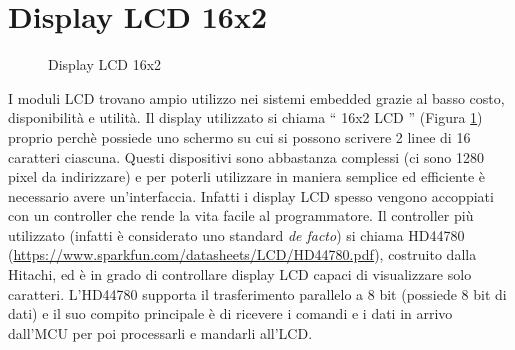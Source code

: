 \documentclass[12pt]{report}
\begin{document}
%
\section{Display LCD 16x2}
%
\begin{figure}[H]
	\caption{Display LCD 16x2}
	\label{fig:16x2}
\end{figure}

I moduli LCD trovano ampio utilizzo nei sistemi embedded grazie al basso costo, disponibilità e utilità. Il display utilizzato si chiama \textquotedblleft{} 16x2 LCD \textquotedblright{} (Figura \ref{fig:16x2}) proprio perchè possiede uno schermo su cui si possono scrivere 2 linee di 16 caratteri ciascuna. Questi dispositivi sono abbastanza complessi (ci sono 1280 pixel da indirizzare) e per poterli utilizzare in maniera semplice ed efficiente è necessario avere un'interfaccia. Infatti i display LCD spesso vengono accoppiati con un controller che rende la vita facile al programmatore. Il controller più utilizzato (infatti è considerato uno standard \textit{de facto}) si chiama HD44780 (\url{https://www.sparkfun.com/datasheets/LCD/HD44780.pdf}), costruito dalla Hitachi, ed è in grado di controllare display LCD capaci di visualizzare solo caratteri. L'HD44780 supporta il trasferimento parallelo a 8 bit (possiede 8 bit di dati) e il suo compito principale è di ricevere i comandi e i dati in arrivo dall'MCU per poi processarli
e mandarli all'LCD.
\end{document}
